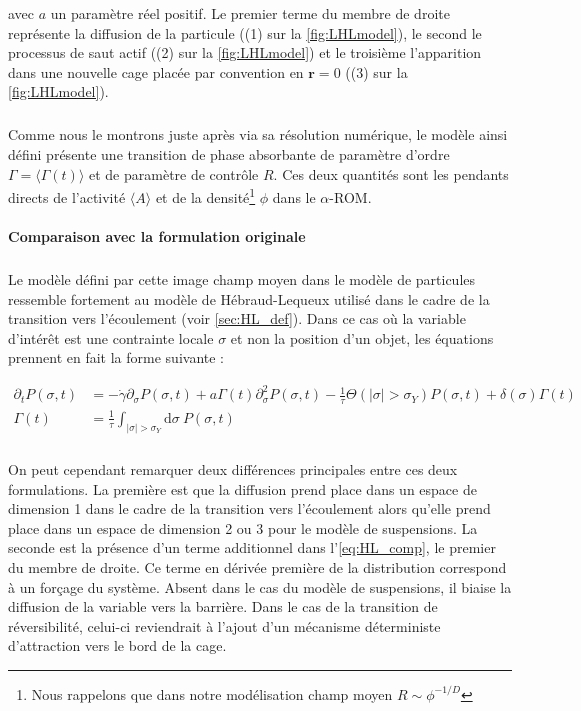 \noindent avec $a$ un paramètre réel positif. Le premier terme du membre de droite représente la diffusion de la particule ((1) sur la \autoref{fig:LHLmodel}), le second le processus de saut actif ((2) sur la \autoref{fig:LHLmodel}) et le troisième l'apparition dans une nouvelle cage placée par convention en $\mathbf{r}=0$ ((3) sur la \autoref{fig:LHLmodel}). 

\subparagraph{}Comme nous le montrons juste après via sa résolution numérique, le modèle ainsi défini présente une transition de phase absorbante de paramètre d'ordre $\Gamma = \langle \Gamma (t) \rangle$ et de paramètre de contrôle $R$. Ces deux quantités sont les pendants directs de l'activité $\langle A \rangle$ et de la densité\footnote{Nous rappelons que dans notre modélisation champ moyen $R\sim \phi^{-1/D}$} $\phi$ dans le $\alpha$-ROM.


\paragraph{Comparaison avec la formulation originale}

\subparagraph{}Le modèle défini par cette image champ moyen dans le modèle de particules ressemble fortement au modèle de Hébraud-Lequeux utilisé dans le cadre de la transition vers l'écoulement (voir \autoref{sec:HL_def}). Dans ce cas où la variable d'intérêt est une contrainte locale $\sigma$ et non la position d'un objet, les équations prennent en fait la forme suivante :

\begin{equation}
\begin{aligned}
    \partial_t P(\sigma, t) &= -\dot{\gamma}\partial_\sigma P(\sigma, t)+a\Gamma (t)\partial_\sigma^2 P(\sigma, t) - \frac{1}{\tau}\Theta(|\sigma|>\sigma_Y)P(\sigma, t) + \delta(\sigma)\Gamma (t)\\
    \Gamma (t) &= \frac{1}{\tau}\int_{|\sigma|>\sigma_Y}\mathrm{d}\sigma~P(\sigma, t)
\end{aligned}
\label{eq:HL_comp}
\end{equation} 

\subparagraph{} On peut cependant remarquer deux différences principales entre ces deux formulations. La première est que la diffusion prend place dans un espace de dimension 1 dans le cadre de la transition vers l'écoulement alors qu'elle prend place dans un espace de dimension 2 ou 3 pour le modèle de suspensions. La seconde est la présence d'un terme additionnel dans l'\autoref{eq:HL_comp}, le premier du membre de droite. Ce terme en dérivée première de la distribution correspond à un forçage du système. Absent dans le cas du modèle de suspensions, il biaise la diffusion de la variable vers la barrière. Dans le cas de la transition de réversibilité, celui-ci reviendrait à l'ajout d'un mécanisme déterministe d'attraction vers le bord de la cage.

